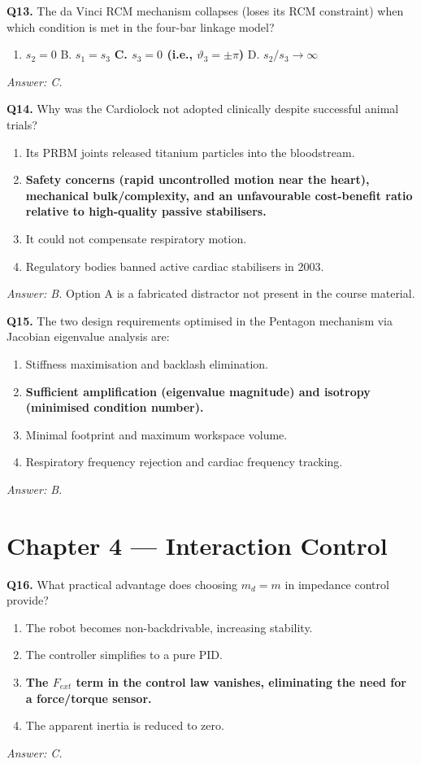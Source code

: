\documentclass[11pt,a4paper,twoside]{report}
\begin{document}
\bigskip
\textbf{Q13.} The da Vinci RCM mechanism collapses (loses its RCM constraint) when which condition is met in the four-bar linkage model?
\begin{enumerate}[label=\Alph*.]
    \item $s_2 = 0$ \quad B. $s_1 = s_3$ \quad \textbf{C. $s_3 = 0$ (i.e., $\vartheta_3 = \pm\pi$)} \quad D. $s_2/s_3 \to \infty$
\end{enumerate}
\textit{Answer: C.}

\bigskip
\textbf{Q14.} Why was the Cardiolock not adopted clinically despite successful animal trials?
\begin{enumerate}[label=\Alph*.]
    \item Its PRBM joints released titanium particles into the bloodstream.
    \item \textbf{Safety concerns (rapid uncontrolled motion near the heart), mechanical bulk/complexity, and an unfavourable cost-benefit ratio relative to high-quality passive stabilisers.}
    \item It could not compensate respiratory motion.
    \item Regulatory bodies banned active cardiac stabilisers in 2003.
\end{enumerate}
\textit{Answer: B.} Option A is a fabricated distractor not present in the course material.

\bigskip
\textbf{Q15.} The two design requirements optimised in the Pentagon mechanism via Jacobian eigenvalue analysis are:
\begin{enumerate}[label=\Alph*.]
    \item Stiffness maximisation and backlash elimination.
    \item \textbf{Sufficient amplification (eigenvalue magnitude) and isotropy (minimised condition number).}
    \item Minimal footprint and maximum workspace volume.
    \item Respiratory frequency rejection and cardiac frequency tracking.
\end{enumerate}
\textit{Answer: B.}

\section{Chapter 4 — Interaction Control}

\textbf{Q16.} What practical advantage does choosing $m_d = m$ in impedance control provide?
\begin{enumerate}[label=\Alph*.]
    \item The robot becomes non-backdrivable, increasing stability.
    \item The controller simplifies to a pure PID.
    \item \textbf{The $F_{ext}$ term in the control law vanishes, eliminating the need for a force/torque sensor.}
    \item The apparent inertia is reduced to zero.
\end{enumerate}
\textit{Answer: C.}
\end{document}
